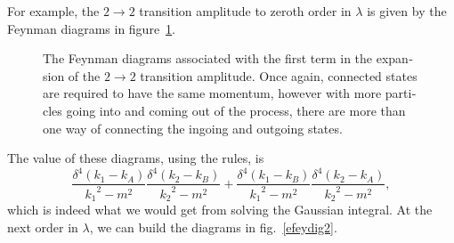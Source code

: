 \begin{english}
For example, the $2\rightarrow2$ transition amplitude to zeroth order in $\lambda$ is given by the Feynman diagrams in figure~\ref{efeydig1}.

\begin{figure}[htp]
\begin{footnotesize}\begin{center}
\end{center}\end{footnotesize}
\caption{The Feynman diagrams associated with the first term in the expansion of the $2\rightarrow2$ transition amplitude. Once again, connected states are required to have the same momentum, however with more particles going into and coming out of the process, there are more than one way of connecting the ingoing and outgoing states.
\label{efeydig1}}
\end{figure}

The value of these diagrams, using the rules, is
\[\frac{\delta^4(k_1-k_A)}{{k_1}^2-m^2}\frac{\delta^4(k_2-k_B)}{{k_2}^2-m^2}+\frac{\delta^4(k_1-k_B)}{{k_1}^2-m^2}\frac{\delta^4(k_2-k_A)}{{k_2}^2-m^2},\]
which is indeed what we would get from solving the Gaussian integral. At the next order in $\lambda$, we can build the diagrams in fig.~\ref{efeydig2}.

\begin{figure}[htp]
\begin{footnotesize}
\begin{minipage}{.09\textwidth}
\normalsize \hfill
\end{minipage}
\begin{minipage}{.9\textwidth}
\begin{center}
\end{center}
\end{minipage}


\end{footnotesize}
\end{figure}
\end{english}
